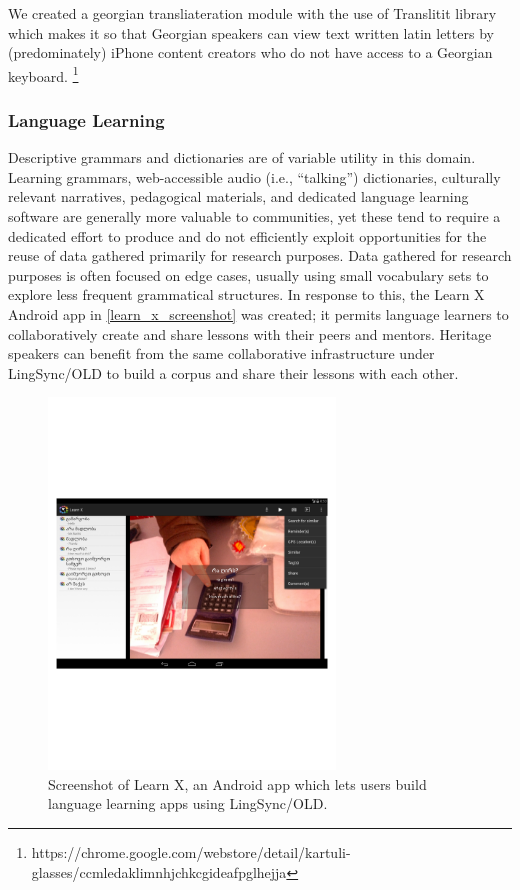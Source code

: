 \documentclass[11pt]{article}
\begin{document}
We created a georgian transliateration module with the use of Translitit library which makes it so that Georgian speakers can view text written latin letters by (predominately) iPhone content creators who do not have access to a Georgian keyboard. \footnote{https://chrome.google.com/webstore/detail/kartuli-glasses/ccmledaklimnhjchkcgideafpglhejja}


\subsubsection{Language Learning}

Descriptive grammars and dictionaries are of variable utility in this domain.
Learning grammars, web-accessible audio (i.e., ``talking'') dictionaries,
culturally relevant narratives, pedagogical materials, and dedicated language
learning software are generally more valuable to communities, yet these tend to
require a dedicated effort to produce and do not efficiently exploit
opportunities for the reuse of data gathered primarily for research purposes. 
Data gathered for research purposes is often focused on edge cases, usually
using small vocabulary sets to explore less frequent grammatical structures.
In response to this, the Learn X Android app in \autoref{learn_x_screenshot}
was created; it permits language learners to collaboratively create and share
lessons with their peers and mentors. Heritage speakers can benefit from the
same collaborative infrastructure under LingSync/OLD to build a corpus and share
their lessons with each other. 



\begin{figure}
\begin{center}
\includegraphics[width=3in]{images/learnX}
\caption{Screenshot of Learn X, an Android app which lets users build language
learning apps using LingSync/OLD.}
\label{learn_x_screenshot}
\end{center}
\end{figure}
\end{document}

